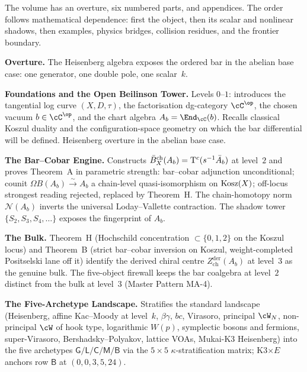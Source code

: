 \noindent
The volume has an overture, six numbered parts, and appendices. The
order follows mathematical dependence: first the object, then its
scalar and nonlinear shadows, then examples, physics bridges,
collision residues, and the frontier boundary.

\medskip

\noindent\textbf{Overture.}\enspace
The Heisenberg algebra exposes the ordered bar in the abelian base
case: one generator, one double pole, one scalar~$k$.

\medskip

\noindent\textbf{Foundations and the Open Beilinson Tower.}\enspace
Levels $0$--$1$: introduces the tangential log curve
$(X, D, \tau)$, the factorisation dg-category $\cC^{\op}$, the
chosen vacuum $b \in \cC^{\op}$, and the chart algebra
$A_b = \End_\cC(b)$. Recalls classical Koszul duality and the
configuration-space geometry on which the bar differential will be
defined. Heisenberg overture in the abelian base case.

\medskip

\noindent\textbf{The Bar--Cobar Engine.}\enspace
Constructs $\bar{B}^{\mathrm{ch}}_X(A_b) = \mathrm{T}^c(s^{-1}\bar A_b)$ at
level~$2$ and proves Theorem~A in parametric strength: bar--cobar
adjunction unconditional; counit $\Omega B(A_b) \xrightarrow{\sim}
A_b$ a chain-level quasi-isomorphism on $\operatorname{Kosz}(X)$; off-locus
strongest reading rejected, replaced by Theorem~H. The chain-homotopy
norm $\mathcal N(A_b)$ inverts the universal Loday--Vallette
contraction. The shadow tower $\{S_2, S_3, S_4, \dots\}$ exposes the
fingerprint of $A_b$.

\medskip

\noindent\textbf{The Bulk.}\enspace
Theorem~H (Hochschild concentration $\subset \{0,1,2\}$ on the
Koszul locus) and Theorem~B (strict bar--cobar inversion on
Koszul, weight-completed Positselski lane off it) identify the
derived chiral centre $Z^{\mathrm{der}}_{\mathrm{ch}}(A_b)$ at
level~$3$ as the genuine bulk. The five-object firewall keeps the
bar coalgebra at level~$2$ distinct from the bulk at level~$3$
(Master Pattern MA-4).

\medskip

\noindent\textbf{The Five-Archetype Landscape.}\enspace
Stratifies the standard landscape (Heisenberg, affine Kac--Moody at
level~$k$, $\beta\gamma$, $bc$, Virasoro, principal $\cW_N$,
non-principal $\cW$ of hook type, logarithmic $W(p)$, symplectic
bosons and fermions, super-Virasoro, Bershadsky--Polyakov, lattice
VOAs, Mukai-K3 Heisenberg) into the five archetypes
$\mathsf G / \mathsf L / \mathsf C / \mathsf M / \mathsf B$ via the
$5{\times}5$ $\kappa$-stratification matrix; K3$\times E$ anchors
row $\mathsf B$ at $(0, 0, 3, 5, 24)$.


